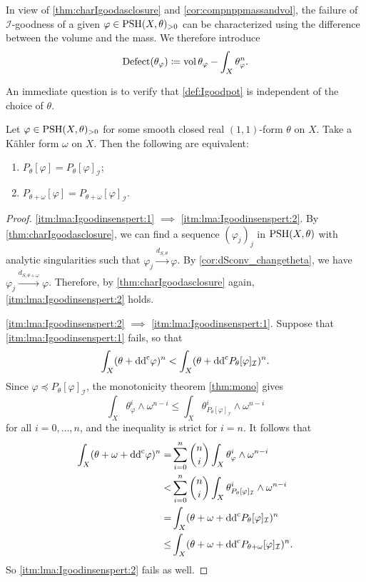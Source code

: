 \begin{remark}\label{rmk:Macron}
    In view of \cref{thm:charIgoodasclosure} and \cref{cor:compnppmassandvol}, the failure of $\mathcal{I}$-goodness of a given $\varphi\in \mathrm{PSH}(X,\theta)_{>0}$ can be characterized using the difference between the volume and the mass. We therefore introduce
    \[
    \mathrm{Defect}(\theta_{\varphi})\coloneqq \operatorname{vol} \theta_{\varphi}-\int_X \theta_{\varphi}^n.
    \]
    \index{$\Macron$}
\end{remark}

An immediate question is to verify that \cref{def:Igoodpot} is independent of the choice of $\theta$.
\begin{lemma}\label{lma:Igoodinsenspert}
Let $\varphi\in \mathrm{PSH}(X,\theta)_{>0}$ for some smooth closed real $(1,1)$-form $\theta$ on $X$. Take a Kähler form $\omega$ on $X$. Then the following are equivalent:
\begin{enumerate}
    \item\label{itm:lma:Igoodinsenspert:1} $P_{\theta}[\varphi]=P_{\theta}[\varphi]_{\mathcal{I}}$;
    \item\label{itm:lma:Igoodinsenspert:2} $P_{\theta+\omega}[\varphi]=P_{\theta+\omega}[\varphi]_{\mathcal{I}}$.
\end{enumerate}
\end{lemma}
\begin{proof}
    \ref{itm:lma:Igoodinsenspert:1} $\implies$ \ref{itm:lma:Igoodinsenspert:2}. By \cref{thm:charIgoodasclosure}, we can find a sequence $(\varphi_j)_j$ in $\mathrm{PSH}(X,\theta)$ with analytic singularities such that $\varphi_j\xrightarrow{d_{S,\theta}}\varphi$. By \cref{cor:dSconv_changetheta}, we have $\varphi_j\xrightarrow{d_{S,\theta+\omega}}\varphi$. Therefore, by \cref{thm:charIgoodasclosure} again, \ref{itm:lma:Igoodinsenspert:2} holds.

    \ref{itm:lma:Igoodinsenspert:2} $\implies$ \ref{itm:lma:Igoodinsenspert:1}. Suppose that \ref{itm:lma:Igoodinsenspert:1} fails, so that
\[
\int_X (\theta+\mathrm{dd}^{\mathrm{c}} \varphi)^n< \int_X (\theta+\mathrm{dd}^{\mathrm{c}} P_{\theta}[\varphi]_{\mathcal{I}})^n.
\]
Since $\varphi \preceq P_{\theta}[\varphi]_{\mathcal I}$, the monotonicity theorem \cref{thm:mono} gives
\[
    \int_X \theta_{\varphi}^i\wedge\omega^{n-i}\leq \int_X \theta_{P_{\theta}[\varphi]_{\mathcal I}}^i\wedge\omega^{n-i}
\]
for all $i=0,\ldots,n$, and the inequality is strict for $i=n$.
It follows that
\[
\begin{aligned}
\int_X (\theta+\omega+\mathrm{dd}^{\mathrm{c}} \varphi)^n
=& \sum_{i=0}^n\binom{n}{i}\int_X \theta_{\varphi}^i\wedge \omega^{n-i}\\
<& \sum_{i=0}^n\binom{n}{i}\int_X \theta_{P_{\theta}[\varphi]_{\mathcal{I}}}^i\wedge \omega^{n-i}\\
=& \int_X (\theta+\omega+\mathrm{dd}^{\mathrm{c}} P_{\theta}[\varphi]_{\mathcal{I}})^n
\\
\leq &\int_X (\theta+\omega+\mathrm{dd}^{\mathrm{c}} P_{\theta+\omega}[\varphi]_{\mathcal{I}})^n.
\end{aligned}
\]
So \ref{itm:lma:Igoodinsenspert:2} fails as well.
\end{proof}



